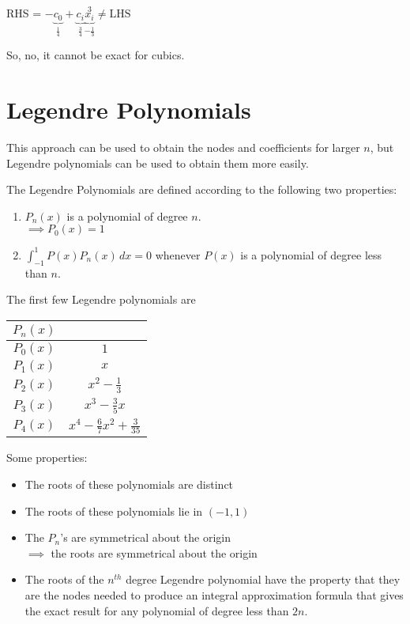 \documentclass[12pt]{article}
\renewcommand{\arraystretch}{1.25} %
\begin{document}
RHS = $-\underbrace{c_0}_{\frac{1}{4}} +
\underbrace{c_i}_{\frac{3}{4}}\underbrace{x_i}_{-\frac{1}{3}}^3 \neq \text{LHS} $

So, no, it cannot be exact for cubics.

\section{Legendre Polynomials}

This approach can be used to obtain the nodes and coefficients for larger $n$,
but Legendre polynomials can be used to obtain them more easily.

The Legendre Polynomials are defined according to the following two properties:

\begin{enumerate}
\item $P_n(x)$ is a polynomial of degree $n$.\\
  $\implies P_0(x) = 1$ 
\item $\int_{-1}^{1} P(x)P_n(x) \, dx = 0$ whenever $P(x)$ is a polynomial of
  degree less than $n$.
\end{enumerate}

The first few Legendre polynomials are

\renewcommand{\arraystretch}{1.25}
\begin{center}
  \begin{tabular}{c|c}
    $P_n(x)$ & \\ \hline
    $P_0(x)$ & $1$ \\
    $P_1(x)$ & $x$ \\
    $P_2(x)$ & $x^2-\frac{1}{3}$ \\
    $P_3(x)$ & $x^3-\frac{3}{5}x$ \\
    $P_4(x)$ & $x^4-\frac{6}{7}x^2+\frac{3}{35}$ \\
  \end{tabular}
\end{center}

Some properties:

\begin{itemize}
\item The roots of these polynomials are distinct
\item The roots of these polynomials lie in $(-1, 1)$
\item The $P_n$'s are symmetrical about the origin\\
  $\implies$ the roots are symmetrical about the origin
\item The roots of the $n^{th}$ degree Legendre polynomial have the property
  that they are the nodes needed to produce an integral approximation formula
  that gives the exact result for any polynomial of degree less than $2n$.
\end{itemize}
\end{document}
